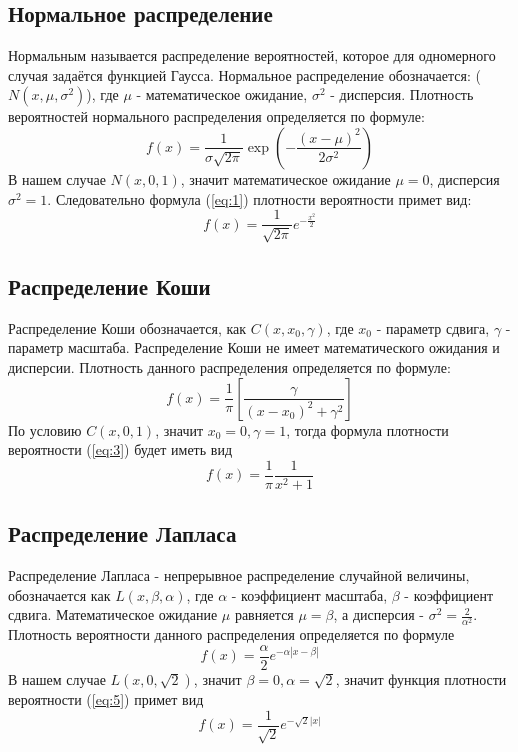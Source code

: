 \documentclass{article}
\begin{document}
\subsection{Нормальное распределение}
Нормальным называется распределение вероятностей, которое для одномерного случая задаётся функцией Гаусса. Нормальное распределение обозначается: ($N(x, \mu, \sigma^2)$), где $\mu$ - математическое ожидание, $\sigma^2$ - дисперсия. Плотность вероятностей нормального распределения определяется по формуле:
\begin{equation}
f(x)=\frac{1}{\sigma \sqrt{2\pi}}\exp(-\frac{(x-\mu)^2}{2\sigma^2})
\label{eq:1}
\end{equation}
В нашем случае $N(x,0,1)$, значит математическое ожидание $\mu=0$, дисперсия $\sigma^2=1$. Следовательно формула (\ref{eq:1}) плотности вероятности примет вид: 
\begin{equation}
f(x)=\frac{1}{\sqrt{2\pi}}e^{-\frac{x^2}{2}}
\label{eq:2}
\end{equation}

\subsection{Распределение Коши}
Распределение Коши обозначается, как $C(x, x_0, \gamma)$, где $x_0$ - параметр сдвига, $\gamma$ - параметр масштаба. Распределение Коши не имеет математического ожидания и дисперсии. Плотность данного распределения определяется по формуле:
\begin{equation}
f(x)=\frac{1}{\pi}[\frac{\gamma}{(x-x_0)^2+\gamma^2}]
\label{eq:3}
\end{equation}
По условию $C(x,0,1)$, значит $x_0=0, \gamma=1$, тогда формула плотности вероятности (\ref{eq:3}) будет иметь вид
\begin{equation}
f(x)=\frac{1}{\pi}\frac{1}{x^2+1}
\label{eq:4}
\end{equation}

\subsection{Распределение Лапласа}
Распределение Лапласа - непрерывное распределение случайной величины, обозначается как $L(x,\beta, \alpha)$, где $\alpha$ - коэффициент масштаба, $\beta$ - коэффициент сдвига. Математическое ожидание $\mu$ равняется $\mu=\beta$, а дисперсия - $\sigma^2=\frac{2}{\alpha^2}$. Плотность вероятности данного распределения определяется по формуле
\begin{equation}
f(x)=\frac{\alpha}{2}e^{-\alpha|x-\beta|}
\label{eq:5}
\end{equation}
В нашем случае $L(x,0,\sqrt{2})$, значит $\beta=0, \alpha=\sqrt{2}$, значит функция плотности вероятности (\ref{eq:5}) примет вид
\begin{equation}
f(x)=\frac{1}{\sqrt{2}}e^{-\sqrt{2}|x|}
\label{eq:6}
\end{equation}
\end{document}
